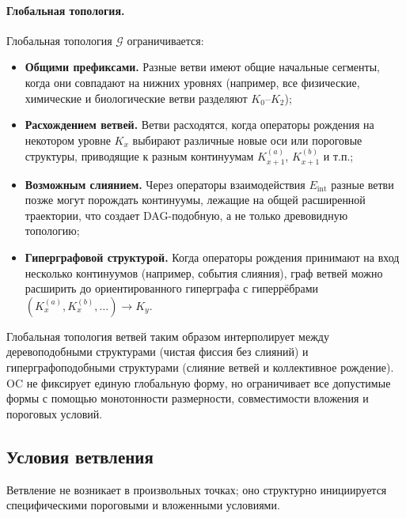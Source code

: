\paragraph{Глобальная топология.}
Глобальная топология \(\mathcal{G}\) ограничивается:
\begin{itemize}
  \item \textbf{Общими префиксами.}\quad
        Разные ветви имеют общие начальные сегменты, когда они совпадают на
        нижних уровнях (например, все физические, химические и
        биологические ветви разделяют \(K_0\)–\(K_2\));
  \item \textbf{Расхождением ветвей.}\quad
        Ветви расходятся, когда операторы рождения на некотором уровне
        \(K_x\) выбирают различные новые оси или пороговые структуры,
        приводящие к разным континуумам \(K_{x+1}^{(a)}\),
        \(K_{x+1}^{(b)}\) и т.п.;
  \item \textbf{Возможным слиянием.}\quad
        Через операторы взаимодействия \(E_{\mathrm{int}}\) разные ветви позже могут
        порождать континуумы, лежащие на общей расширенной траектории,
        что создает DAG-подобную, а не только древовидную топологию;
  \item \textbf{Гиперграфовой структурой.}\quad
        Когда операторы рождения принимают на вход несколько континуумов
        (например, события слияния), граф ветвей можно расширить до
        ориентированного гиперграфа с гиперрёбрами
        \((K_{x}^{(a)}, K_{x}^{(b)},\dots) \to K_{y}\).
\end{itemize}

Глобальная топология ветвей таким образом интерполирует между деревоподобными
структурами (чистая фиссия без слияний) и гиперграфоподобными структурами
(слияние ветвей и коллективное рождение). OC не фиксирует единую глобальную
форму, но ограничивает все допустимые формы с помощью монотонности
размерности, совместимости вложения и пороговых условий.

\subsection{Условия ветвления}

Ветвление не возникает в произвольных точках; оно структурно инициируется
специфическими пороговыми и вложенными условиями.


